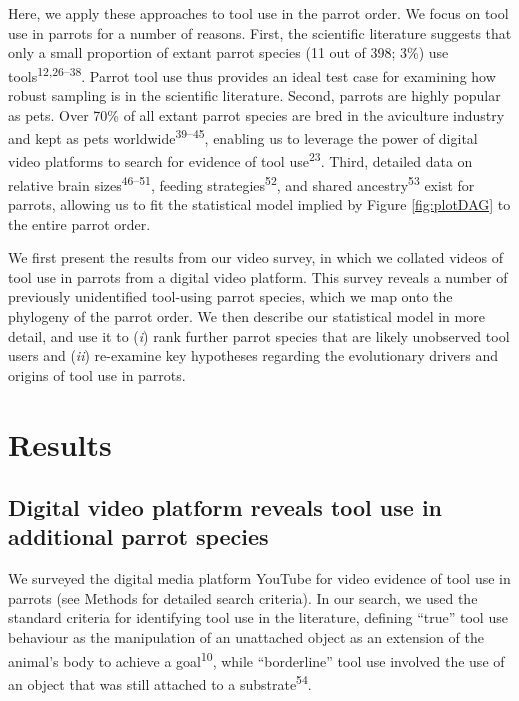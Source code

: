 \documentclass[
  man, donotrepeattitle,floatsintext]{apa6}
\begin{document}
Here, we apply these approaches to tool use in the parrot order. We focus on
tool use in parrots for a number of reasons. First, the scientific literature
suggests that only a small proportion of extant parrot species (11 out of 398;
3\%) use tools\textsuperscript{12,26--38}. Parrot tool
use thus provides an ideal test case for examining how robust sampling is in the
scientific literature. Second, parrots are highly popular as pets. Over 70\% of
all extant parrot species are bred in the aviculture industry and kept as pets
worldwide\textsuperscript{39--45}, enabling us to leverage the power of digital video platforms to
search for evidence of tool use\textsuperscript{23}. Third, detailed data on relative
brain sizes\textsuperscript{46--51}, feeding strategies\textsuperscript{52}, and shared ancestry\textsuperscript{53} exist for parrots, allowing us to fit the statistical model implied
by Figure \ref{fig:plotDAG} to the entire parrot order.

We first present the results from our video survey, in which we collated videos
of tool use in parrots from a digital video platform. This survey reveals a
number of previously unidentified tool-using parrot species, which we map onto
the phylogeny of the parrot order. We then describe our statistical model in
more detail, and use it to (\emph{i}) rank further parrot species that are likely
unobserved tool users and (\emph{ii}) re-examine key hypotheses regarding the
evolutionary drivers and origins of tool use in parrots.

\hypertarget{results}{%
\section{Results}\label{results}}

\hypertarget{digital-video-platform-reveals-tool-use-in-additional-parrot-species}{%
\subsection{Digital video platform reveals tool use in additional parrot species}\label{digital-video-platform-reveals-tool-use-in-additional-parrot-species}}

We surveyed the digital media platform YouTube for video evidence of tool use in
parrots (see Methods for detailed search criteria). In our search, we used the
standard criteria for identifying tool use in the literature, defining ``true''
tool use behaviour as the manipulation of an unattached object as an extension
of the animal's body to achieve a goal\textsuperscript{10}, while ``borderline'' tool
use involved the use of an object that was still attached to a substrate\textsuperscript{54}.
\end{document}
